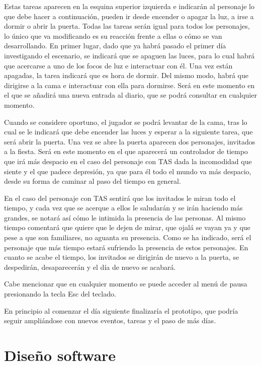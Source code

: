 \documentclass[12pt, a4paper,twoside,titlepage]{book}
\begin{document}
Estas tareas aparecen en la esquina superior izquierda e indicarán al personaje lo que debe hacer a continuación, pueden ir desde encender o apagar la luz, a irse a dormir o abrir la puerta. Todas las tareas serán igual para todos los personajes, lo único que va modificando es su reacción frente a ellas o cómo se van desarrollando. En primer lugar, dado que ya habrá pasado el primer día investigando el escenario, se indicará que se apaguen las luces, para lo cual habrá que acercarse a uno de los focos de luz e interactuar con él. Una vez están apagadas, la tarea indicará que es hora de dormir. Del mismo modo, habrá que dirigirse a la cama e interactuar con ella para dormirse. Será en este momento en el que se añadirá una nueva entrada al diario, que se podrá consultar en cualquier momento. 

Cuando se considere oportuno, el jugador se podrá levantar de la cama, tras lo cual se le indicará que debe encender las luces y esperar a la siguiente tarea, que será abrir la puerta. Una vez se abre la puerta aparecen dos personajes, invitados a la fiesta. Será en este momento en el que aparecerá un controlador de tiempo que irá más despacio en el caso del personaje con TAS dada la incomodidad que siente y el que padece depresión, ya que para él todo el mundo va más despacio, desde su forma de caminar al paso del tiempo en general.

En el caso del personaje con TAS sentirá que los invitados le miran todo el tiempo, y cada vez que se acerque a ellos le saludarán y se irán haciendo más grandes, se notará así cómo le intimida la presencia de las personas. Al mismo tiempo comentará que quiere que le dejen de mirar, que ojalá se vayan ya y que pese a que son familiares, no aguanta su presencia. Como se ha indicado, será el personaje que más tiempo estará sufriendo la presencia de estos personajes. En cuanto se acabe el tiempo, los invitados se dirigirán de nuevo a la puerta, se despedirán, desaparecerán y el día de nuevo se acabará. 

Cabe mencionar que en cualquier momento se puede acceder al menú de pausa presionando la tecla Esc del teclado. 
 
En principio al comenzar el día siguiente finalizaría el prototipo, que podría seguir ampliándose con nuevos eventos, tareas y el paso de más días. 


\section{Diseño software}
\label{sec:diseñoSw}
\end{document}
